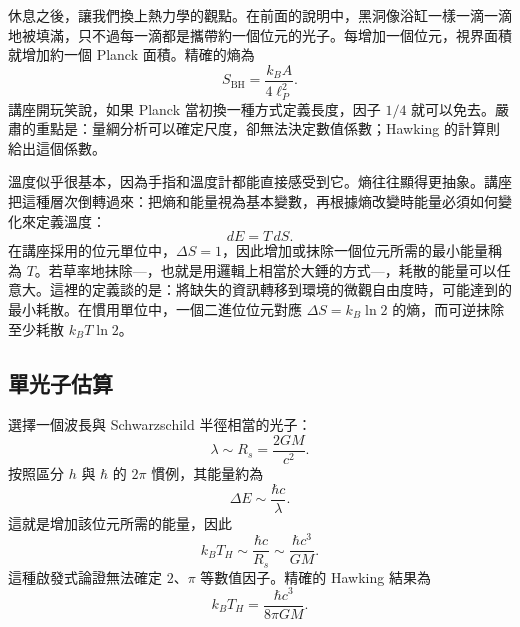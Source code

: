 休息之後，讓我們換上熱力學的觀點。在前面的說明中，黑洞像浴缸一樣一滴一滴地被填滿，只不過每一滴都是攜帶約一個位元的光子。每增加一個位元，視界面積就增加約一個 Planck 面積。精確的熵為
\begin{equation}
S_{\mathrm{BH}}=\frac{k_B A}{4\ell_P^2}.
\end{equation}
講座開玩笑說，如果 Planck 當初換一種方式定義長度，因子 \(1/4\) 就可以免去。嚴肅的重點是：量綱分析可以確定尺度，卻無法決定數值係數；Hawking 的計算則給出這個係數。

溫度似乎很基本，因為手指和溫度計都能直接感受到它。熵往往顯得更抽象。講座把這種層次倒轉過來：把熵和能量視為基本變數，再根據熵改變時能量必須如何變化來定義溫度：
\begin{equation}
dE=T\,dS.
\end{equation}
在講座採用的位元單位中，\(\Delta S=1\)，因此增加或抹除一個位元所需的最小能量稱為 \(T\)。若草率地抹除---，也就是用邏輯上相當於大錘的方式---，耗散的能量可以任意大。這裡的定義談的是：將缺失的資訊轉移到環境的微觀自由度時，可能達到的最小耗散。在慣用單位中，一個二進位位元對應 \(\Delta S=k_B\ln2\) 的熵，而可逆抹除至少耗散 \(k_BT\ln2\)。

\subsection{單光子估算}

選擇一個波長與 Schwarzschild 半徑相當的光子：
\begin{equation}
\lambda\sim R_s=\frac{2GM}{c^2}.
\end{equation}
按照區分 \(h\) 與 \(\hbar\) 的 \(2\pi\) 慣例，其能量約為
\begin{equation}
\Delta E\sim \frac{\hbar c}{\lambda}.
\end{equation}
這就是增加該位元所需的能量，因此
\begin{equation}
k_BT_H\sim\frac{\hbar c}{R_s}
\sim\frac{\hbar c^3}{GM}.
\label{eq:l03-hawking-scale}
\end{equation}
這種啟發式論證無法確定 \(2\)、\(\pi\) 等數值因子。精確的 Hawking 結果為
\begin{equation}
\boxed{k_BT_H=\frac{\hbar c^3}{8\pi GM}.}
\label{eq:l03-hawking-exact}
\end{equation}

